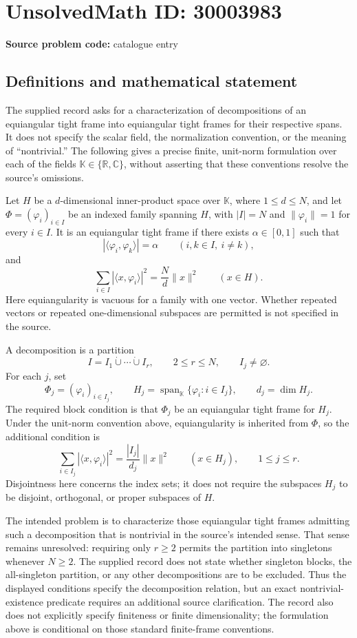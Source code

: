 \documentclass[11pt]{article}
\newcommand{\R}{\mathbb{R}}
\newcommand{\C}{\mathbb{C}}
\begin{document}
\section*{UnsolvedMath ID: 30003983}
\textbf{Source problem code:} catalogue entry
\subsection{Definitions and mathematical statement}
The supplied record asks for a characterization of decompositions of an equiangular tight frame into equiangular tight frames for their respective spans. It does not specify the scalar field, the normalization convention, or the meaning of ``nontrivial.'' The following gives a precise finite, unit-norm formulation over each of the fields \(\mathbb K\in\{\R,\C\}\), without asserting that these conventions resolve the source's omissions.

Let \(H\) be a \(d\)-dimensional inner-product space over \(\mathbb K\), where \(1\le d\le N\), and let \(\Phi=(\varphi_i)_{i\in I}\) be an indexed family spanning \(H\), with \(|I|=N\) and \(\|\varphi_i\|=1\) for every \(i\in I\). It is an equiangular tight frame if there exists \(\alpha\in[0,1]\) such that
\[
 |\langle\varphi_i,\varphi_k\rangle|=\alpha
 \qquad(i,k\in I,\ i\ne k),
\]
and
\[
 \sum_{i\in I}|\langle x,\varphi_i\rangle|^2
 =\frac{N}{d}\|x\|^2
 \qquad(x\in H).
\]
Here equiangularity is vacuous for a family with one vector. Whether repeated vectors or repeated one-dimensional subspaces are permitted is not specified in the source.

A decomposition is a partition
\[
 I=I_1\mathbin{\dot\cup}\cdots\mathbin{\dot\cup}I_r,
 \qquad 2\le r\le N,\qquad I_j\ne\varnothing.
\]
For each \(j\), set
\[
 \Phi_j=(\varphi_i)_{i\in I_j},\qquad
 H_j=\operatorname{span}_{\mathbb K}\{\varphi_i:i\in I_j\},\qquad
 d_j=\dim H_j.
\]
The required block condition is that \(\Phi_j\) be an equiangular tight frame for \(H_j\). Under the unit-norm convention above, equiangularity is inherited from \(\Phi\), so the additional condition is
\[
 \sum_{i\in I_j}|\langle x,\varphi_i\rangle|^2
 =\frac{|I_j|}{d_j}\|x\|^2
 \qquad(x\in H_j),\qquad 1\le j\le r.
\]
Disjointness here concerns the index sets; it does not require the subspaces \(H_j\) to be disjoint, orthogonal, or proper subspaces of \(H\).

The intended problem is to characterize those equiangular tight frames admitting such a decomposition that is nontrivial in the source's intended sense. That sense remains unresolved: requiring only \(r\ge2\) permits the partition into singletons whenever \(N\ge2\). The supplied record does not state whether singleton blocks, the all-singleton partition, or any other decompositions are to be excluded. Thus the displayed conditions specify the decomposition relation, but an exact nontrivial-existence predicate requires an additional source clarification. The record also does not explicitly specify finiteness or finite dimensionality; the formulation above is conditional on those standard finite-frame conventions.
\end{document}
